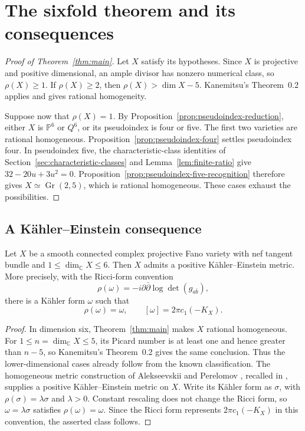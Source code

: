 \section{The sixfold theorem and its consequences}\label{sec:conclusion}

\begin{proof}[Proof of Theorem~\ref{thm:main}]
Let $X$ satisfy its hypotheses. Since $X$ is projective and positive
dimensional, an ample divisor has nonzero numerical class, so
$\rho(X)\geq1$. If $\rho(X)\geq2$, then
$\rho(X)>\dim X-5$. Kanemitsu's Theorem~0.2
\cite{Kanemitsu2016} applies and gives rational homogeneity.

Suppose now that $\rho(X)=1$.
By Proposition~\ref{prop:pseudoindex-reduction}, either $X$ is
$\mathbb P^6$ or $Q^6$, or its pseudoindex is four or five.
The first two varieties are rational homogeneous.
Proposition~\ref{prop:pseudoindex-four} settles pseudoindex four.
In pseudoindex five, the characteristic-class identities of
Section~\ref{sec:characteristic-classes} and
Lemma~\ref{lem:finite-ratio} give $32-20u+3u^2=0$.
Proposition~\ref{prop:pseudoindex-five-recognition} therefore gives
$X\simeq\operatorname{Gr}(2,5)$, which is rational homogeneous.
These cases exhaust the possibilities.
\end{proof}

\subsection{A K\"ahler--Einstein consequence}

\begin{corollary}\label{cor:positive-ke}
Let $X$ be a smooth connected complex projective Fano variety with nef
tangent bundle and $1\leq\dim_{\mathbb C}X\leq6$.
Then $X$ admits a positive K\"ahler--Einstein metric. More precisely,
with the Ricci-form convention
\[
 \rho(\omega)=-i\partial\bar\partial\log\det(g_{a\bar b}),
\]
there is a K\"ahler form $\omega$ such that
\[
 \rho(\omega)=\omega,\qquad [\omega]=2\pi c_1(-K_X).
\]
\end{corollary}

\begin{proof}
In dimension six, Theorem~\ref{thm:main} makes $X$ rational homogeneous.
For $1\leq n=\dim_{\mathbb C}X\leq5$, its Picard number is at least
one and hence greater than $n-5$, so Kanemitsu's Theorem~0.2
\cite{Kanemitsu2016} gives the same conclusion. Thus the
lower-dimensional cases already follow from the known classification.
The homogeneous metric construction of Alekseevskii and Perelomov
\cite{AlekseevskiiPerelomov1986}, recalled in
\cite[\S1, p.~285]{Demailly2018AlmostKE}, supplies a positive
K\"ahler--Einstein metric on $X$.
Write its K\"ahler form as $\sigma$, with
$\rho(\sigma)=\lambda\sigma$ and $\lambda>0$. Constant rescaling
does not change the Ricci form, so $\omega=\lambda\sigma$ satisfies
$\rho(\omega)=\omega$. Since the Ricci form represents
$2\pi c_1(-K_X)$ in this convention, the asserted class follows.
\end{proof}

